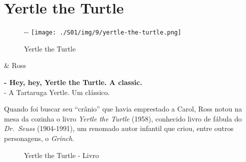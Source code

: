 \hypertarget{yertle-the-turtle}{%
\section{Yertle the Turtle}\label{yertle-the-turtle}}

\begin{figure}[!ht]
  \begin{adjustwidth}{-\oddsidemargin-1in}{-\rightmargin}
    \centering
    \texttt{[image: ./S01/img/9/yertle-the-turtle.png]}
    \caption{Yertle the Turtle\label{fig:yertle-the-turtle}}
  \end{adjustwidth}
\end{figure}

\begin{tcolorbox}[enhanced,center upper,
    drop fuzzy shadow southeast, boxrule=0.3pt,
    lower separated=false,
    colframe=black!30!dialogoBorder,colback=white]
\begin{minipage}[c]{0.14\linewidth}
   & \centering \scriptsize{Ross}
\end{minipage}
\hspace{.1mm}
\begin{minipage}[c]{0.8\linewidth}
  \textbf{- Hey, hey, Yertle the Turtle. A classic.}\\
  - A Tartaruga Yertle. Um clássico.
\end{minipage}
\end{tcolorbox}

Quando foi buscar seu ``crânio'' que havia emprestado a Carol, Ross
notou na mesa da cozinha o livro \emph{Yertle the Turtle} (1958),
conhecido livro de fábula do \emph{Dr.~Seuss} (1904-1991), um renomado
autor infantil que criou, entre outros personagens, o \emph{Grinch}.

\begin{figure}
  \centering
    \caption{Yertle the Turtle - Livro\label{fig:yertle-the-turtle-livro}}
\end{figure}

